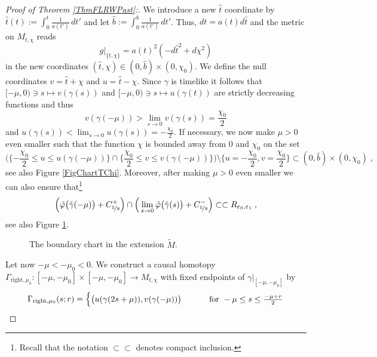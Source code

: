 \documentclass[reqno]{article}
\newcommand{\Reps}{R_{\varepsilon_0, \varepsilon_1}}
\begin{document}
\begin{proof}[Proof of Theorem \ref{ThmFLRWPast}:]
We introduce a new $\hat{t}$ coordinate by $\hat{t}(t) := \int_0^t \frac{1}{a(t')} \, dt'$ and let $\hat{b} := \int_0^b \frac{1}{a(t')} \, dt'$. Thus, $dt = a(t) d\hat{t}$ and the metric on $M_{t, \chi}$ reads   $$ g|_{\{t,\chi\}} = a(t)^2 (-d\hat{t}^2 + d\chi^2) $$ in the new coordinates $(\hat{t}, \chi) \in (0, \hat{b})\times (0,\chi_0)$.
We define the null coordinates $v = \hat{t} + \chi$ and $u = \hat{t} - \chi$. Since $\gamma$ is timelike it follows that $ [-\mu, 0 ) \ni s \mapsto v(\gamma(s))$ and 
$[-\mu, 0) \ni s \mapsto u(\gamma(t))$ are strictly decreasing functions and thus \begin{equation}
\label{EqBoundV}v(\gamma(-\mu)) > \lim_{s \to 0} v(\gamma(s)) = \frac{\chi_0}{2}
\end{equation}
and $u(\gamma(s)) < \lim_{s \to 0} u(\gamma(s)) = -\frac{\chi_0}{2}$. If necessary, we now make $\mu >0$ even smaller such that the function $\chi$ is bounded away from $0$ and $\chi_0$ on the set $$\Big( \{-\frac{\chi_0}{2} \leq u \leq u(\gamma(-\mu))\}  \cap \{\frac{\chi_0}{2} \leq v \leq v(\gamma(-\mu))\} \Big) \setminus \{u = -\frac{\chi_0}{2}, v = \frac{\chi_0}{2}\}  \subset (0, \hat{b}) \times (0,\chi_0) \;, $$ see also Figure \ref{FigChartTChi}. Moreover, after making $\mu>0$ even smaller we can also ensure that\footnote{Recall that the notation $\subset \subset$ denotes compact inclusion.} $$\Big(\tilde{\varphi}\big(\tilde{\gamma}(-\mu)\big) + C^+_{\nicefrac{5}{8}}\Big) \cap \Big(\lim_{s \to 0}\tilde{\varphi}\big(\tilde{\gamma}(s)\big) + C^-_{\nicefrac{5}{8}}\Big) \subset\subset \Reps \;,$$ see also Figure \ref{FigBoundaryChart}.
\begin{figure}[h]
\centering
\begin{minipage}{.5\textwidth}
  \centering
 \def\svgwidth{9cm}
   
      \caption{The $\{t,\chi\}$-plane in $M$.} \label{FigChartTChi}
\end{minipage}%
\begin{minipage}{.5\textwidth}
  \centering
  \def\svgwidth{7cm}
  
     \caption{The boundary chart in the extension $\tilde{M}$.} \label{FigBoundaryChart}
\end{minipage}
\end{figure}
Let now $-\mu < -\mu_0 < 0$. We construct a causal homotopy $\Gamma_{\mathrm{right}, \mu_0} : [-\mu, -\mu_0] \times [-\mu, -\mu_0] \to M_{t,\chi}$ with fixed endpoints of $\gamma|_{[-\mu, -\mu_0]}$ by
\begin{equation*}
\Gamma_{\mathrm{right}, \mu_0}  (s;r) = \begin{cases} \big( u(\gamma(2s + \mu)), v(\gamma(-\mu))\big) \qquad &\textnormal{ for } - \mu \leq s \leq \frac{-\mu + r}{2} \\

\end{cases}
\end{equation*}
\end{proof}
\end{document}
